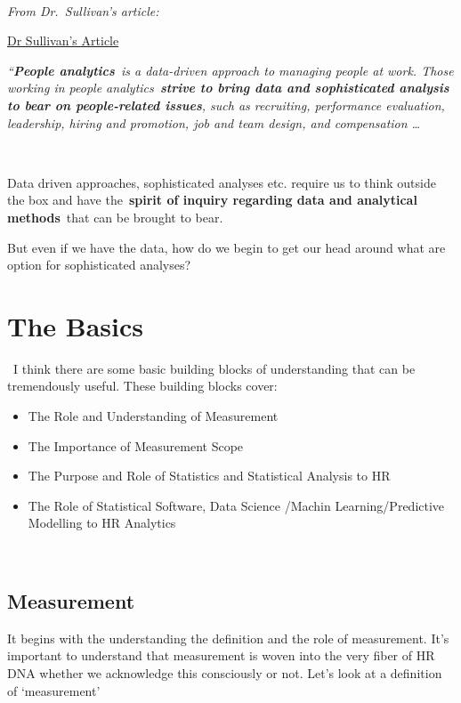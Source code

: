 \documentclass[
]{article}
\begin{document}
~

\emph{From Dr.~Sullivan's article:}

\href{http://www.eremedia.com/tlnt/how-google-is-using-people-analytics-to-completely-reinvent-hr/}{Dr Sullivan's Article}

\emph{``\textbf{People analytics}~is a data-driven approach to managing
people at work. Those working in people analytics~\textbf{strive to
bring data and sophisticated analysis to bear on people-related issues},
such as recruiting, performance evaluation, leadership, hiring and
promotion, job and team design, and compensation \ldots{}}

~

Data driven approaches, sophisticated analyses etc. require us to think
outside the box and have the~\textbf{spirit of inquiry regarding data
and analytical methods}~that can be brought to bear.

But even if we have the data, how do we begin to get our head around
what are option for sophisticated analyses?

\section{The Basics}\label{the-basics}

~I think there are some basic building blocks of understanding that can
be tremendously useful. These building blocks cover:

\begin{itemize}
\item
  The Role and Understanding of Measurement
\item
  The Importance of Measurement Scope
\item
  The Purpose and Role of Statistics and Statistical Analysis to HR
\item
  The Role of Statistical Software, Data Science /Machin Learning/Predictive Modelling to HR Analytics
\end{itemize}

~

\subsection{Measurement}\label{measurement}

It begins with the understanding the definition and the role of
measurement. It's important to understand that measurement is woven into
the very fiber of HR DNA whether we acknowledge this consciously or not.
Let's look at a definition of `measurement'
\end{document}
